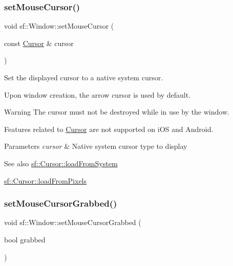 \subsubsection{\texorpdfstring{setMouseCursor()}{setMouseCursor()}}
{\footnotesize\ttfamily void sf\+::\+Window\+::set\+Mouse\+Cursor (\begin{DoxyParamCaption}\item[{const \mbox{\hyperlink{classsf_1_1_cursor}{Cursor}} \&}]{cursor }\end{DoxyParamCaption})}



Set the displayed cursor to a native system cursor. 

Upon window creation, the arrow cursor is used by default.

\begin{DoxyWarning}{Warning}
The cursor must not be destroyed while in use by the window.

Features related to \mbox{\hyperlink{classsf_1_1_cursor}{Cursor}} are not supported on i\+OS and Android.
\end{DoxyWarning}

\begin{DoxyParams}{Parameters}
{\em cursor} & Native system cursor type to display\\
\hline
\end{DoxyParams}
\begin{DoxySeeAlso}{See also}
\mbox{\hyperlink{classsf_1_1_cursor_ad41999c8633c2fbaa2364e379c1ab25b}{sf\+::\+Cursor\+::load\+From\+System}} 

\mbox{\hyperlink{classsf_1_1_cursor_ac24ecf82ac7d9ba6703389397f948b3a}{sf\+::\+Cursor\+::load\+From\+Pixels}} \begin{DoxyVerb}\end{DoxyVerb}
 
\end{DoxySeeAlso}
\mbox{\label{classsf_1_1_window_a5b4ef8ede77531e17b7a0287fa6ff9ce}} 
\subsubsection{\texorpdfstring{setMouseCursorGrabbed()}{setMouseCursorGrabbed()}}
{\footnotesize\ttfamily void sf\+::\+Window\+::set\+Mouse\+Cursor\+Grabbed (\begin{DoxyParamCaption}\item[{bool}]{grabbed }\end{DoxyParamCaption})}




